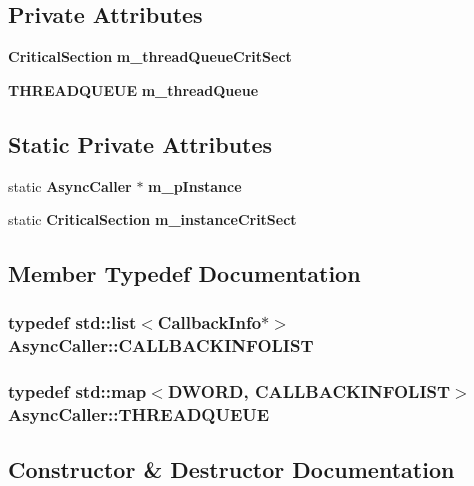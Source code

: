\subsection*{Private Attributes}
\begin{CompactItemize}
\item 
{\bf Critical\-Section} {\bf m\_\-thread\-Queue\-Crit\-Sect}
\item 
{\bf THREADQUEUE} {\bf m\_\-thread\-Queue}
\end{CompactItemize}
\subsection*{Static Private Attributes}
\begin{CompactItemize}
\item 
static {\bf Async\-Caller} $\ast$ {\bf m\_\-p\-Instance}
\item 
static {\bf Critical\-Section} {\bf m\_\-instance\-Crit\-Sect}
\end{CompactItemize}


\subsection{Member Typedef Documentation}
\subsubsection{\setlength{\rightskip}{0pt plus 5cm}typedef std::list$<${\bf Callback\-Info}$\ast$$>$ {\bf Async\-Caller::CALLBACKINFOLIST}\hspace{0.3cm}{\tt  [private]}}\label{class_async_caller_96982b0df7c13ff0d704ec62bed89177}


\subsubsection{\setlength{\rightskip}{0pt plus 5cm}typedef std::map$<$DWORD, {\bf CALLBACKINFOLIST}$>$ {\bf Async\-Caller::THREADQUEUE}\hspace{0.3cm}{\tt  [private]}}\label{class_async_caller_598329a2560543f300d6eabc1d64294b}




\subsection{Constructor \& Destructor Documentation}
